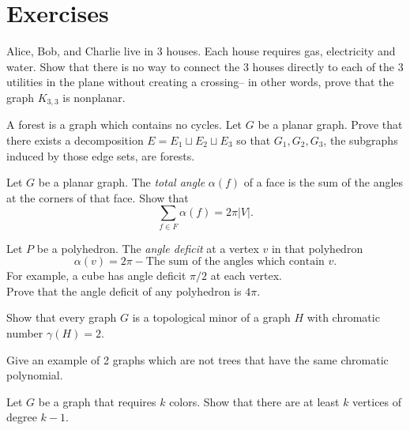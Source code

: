 \section{Exercises}

\begin{exercise}
Alice, Bob, and Charlie live in 3 houses. Each house requires gas, electricity and water. Show that there is no way to connect the 3 houses directly to each of the 3 utilities in the plane without creating a crossing-- in other words, prove that the graph $K_{3,3}$ is nonplanar. 
\label{exer:utilities}
\end{exercise}

\begin{exercise} 
A forest is a graph which contains no cycles. Let $G$ be a planar graph. Prove that there exists a decomposition $E=E_1\sqcup E_2\sqcup E_3$ so that $G_1, G_2, G_3$, the subgraphs induced by those edge sets, are forests.
\label{exer:planarforest}
\end{exercise}


\begin{exercise}
Let $G$ be a planar graph. The \emph{total angle} $\alpha(f)$ of a face is the sum of the  angles at the corners of that face. Show that 
\[\sum_{f\in F} \alpha(f) = 2\pi |V|.\]
\label{exer:totalangleplanar}
\end{exercise}

\begin{exercise}
Let $P$ be a polyhedron. The \emph{angle deficit} at a vertex $v$ in that polyhedron 
\[\alpha(v)=2\pi- \text{The sum of the angles which contain $v$.}\]
For example, a cube has angle deficit $\pi/2$ at each vertex.\\
Prove that the angle deficit of any polyhedron is $4\pi$. 

\label{exer:angledeficit}
\end{exercise}

\begin{exercise}
Show that every graph $G$ is a topological minor of a graph $H$ with chromatic number $\gamma(H)=2$. 
\label{exer:topologicalminorbipartite}
\end{exercise}

\begin{exercise}
Give an example of 2 graphs which are not trees that have the same chromatic polynomial. 
\label{exer:chromaticpolynomial}
\end{exercise}

\begin{exercise}
Let $G$ be a graph that requires $k$ colors. Show that there are at least $k$ vertices of degree $k-1$. 
\label{exer:coloringedges}
\end{exercise}

